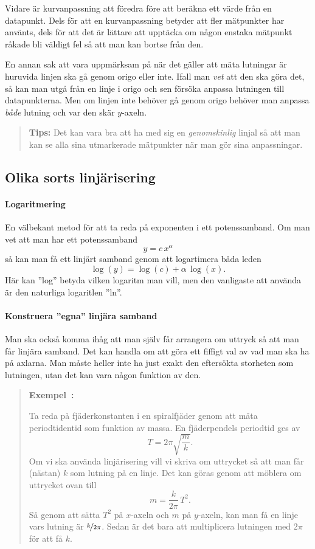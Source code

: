 \documentclass[11pt,a4paper, swedish
]{article}
\newcounter{exempel_counter}%
\newenvironment{exempel}
{
  \refstepcounter{exempel_counter}
  \begin{quote}
  \noindent\textbf{Exempel~\arabic{exempel_counter}:}
}{
  \end{quote}
}
\begin{document}
Vidare är kurvanpassning att föredra före att beräkna ett värde från
en datapunkt. Dels för att en kurvanpassning betyder att
fler mätpunkter har använts, dels för att det är lättare att upptäcka
om någon enstaka mätpunkt råkade bli väldigt fel så att man kan bortse
från den. 

En annan sak att vara uppmärksam på när det gäller att mäta lutningar
är huruvida linjen ska gå genom origo eller inte. Ifall man \emph{vet}
att den ska göra det, så kan man utgå från en linje i origo och sen
försöka anpassa lutningen till datapunkterna. Men om linjen inte
behöver gå genom origo behöver man anpassa \emph{både} lutning och var
den skär $y$-axeln. 


\begin{quote}
  \textbf{Tips: } Det kan vara bra att ha med sig en
  \emph{genomskinlig} linjal så att man kan se alla sina utmarkerade
  mätpunkter när man gör sina anpassningar. 
\end{quote}


\subsection{Olika sorts linjärisering}
\paragraph{Logaritmering}
En välbekant metod för att ta reda på exponenten i ett
potenssamband. Om man vet att man har ett potenssamband
\begin{equation}
y=c\,x^\alpha
\end{equation}
så kan man få ett linjärt samband genom att logartimera båda leden
\begin{equation}
\log(y) = \log(c) + \alpha\,\log(x).
\end{equation}
Här kan ''log'' betyda vilken logaritm man vill, men den vanligaste
att använda är den naturliga logaritlen ''ln''. 

\paragraph{Konstruera ''egna'' linjära samband}
Man ska också komma ihåg att man själv får arrangera om uttryck så att
man får linjära samband. Det kan handla om att göra ett fiffigt val av
vad man ska ha på axlarna. Man måste heller inte ha just exakt den
eftersökta storheten som lutningen, utan det kan vara någon funktion
av den.

\begin{exempel}
Ta reda på fjäderkonstanten i en spiralfjäder genom att mäta periodtidentid
som funktion av massa. En fjäderpendels periodtid ges av
\[
T=2\pi\sqrt{\frac{m}{k}}.
\]
Om vi ska använda linjärisering vill vi skriva om uttrycket så att man
får (nästan) $k$ som lutning på en linje. Det kan göras genom att möblera om
uttrycket ovan till
\[
m=\frac{k}{2\pi}\,T^2.
\]
Så genom att sätta $T^2$ på $x$-axeln och $m$ på $y$-axeln, kan man få
en linje vars lutning är $\nicefrac{k}{2\pi}$. Sedan är det bara att
multiplicera lutningen med $2\pi$ för att få $k$.
\end{exempel}
\end{document}
